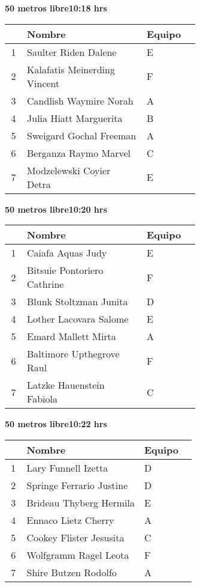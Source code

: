 \begin{minipage}{0.95\linewidth}
\begin{center}
\textbf{
50 metros libre\hspace{1cm}10:18 hrs}
\end{center}
\begin{tabular}{cp{0.63\linewidth}l}
\hline
& \textbf{Nombre} & \textbf{Equipo} \\ \hline
1 & Saulter Riden Dalene & E \\ 
2 & Kalafatis Meinerding Vincent & F \\ 
3 & Candlish Waymire Norah & A \\ 
4 & Julia Hiatt Marguerita & B \\ 
5 & Sweigard Gochal Freeman & A \\ 
6 & Berganza Raymo Marvel & C \\ 
7 & Modzelewski Coyier Detra & E \\ 
\end{tabular}
\end{minipage}
\begin{minipage}{0.95\linewidth}
\begin{center}
\textbf{
50 metros libre\hspace{1cm}10:20 hrs}
\end{center}
\begin{tabular}{cp{0.63\linewidth}l}
\hline
& \textbf{Nombre} & \textbf{Equipo} \\ \hline
1 & Caiafa Aquas Judy & E \\ 
2 & Bitsuie Pontoriero Cathrine & F \\ 
3 & Blunk Stoltzman Junita & D \\ 
4 & Lother Lacovara Salome & E \\ 
5 & Emard Mallett Mirta & A \\ 
6 & Baltimore Upthegrove Raul & F \\ 
7 & Latzke Hauenstein Fabiola & C \\ 
\end{tabular}
\end{minipage}
\begin{minipage}{0.95\linewidth}
\begin{center}
\textbf{
50 metros libre\hspace{1cm}10:22 hrs}
\end{center}
\begin{tabular}{cp{0.63\linewidth}l}
\hline
& \textbf{Nombre} & \textbf{Equipo} \\ \hline
1 & Lary Funnell Izetta & D \\ 
2 & Springe Ferrario Justine & D \\ 
3 & Brideau Thyberg Hermila & E \\ 
4 & Ennaco Lietz Cherry & A \\ 
5 & Cookey Flister Jesusita & C \\ 
6 & Wolfgramm Ragel Leota & F \\ 
7 & Shire Butzen Rodolfo & A \\ 
\end{tabular}
\end{minipage}
